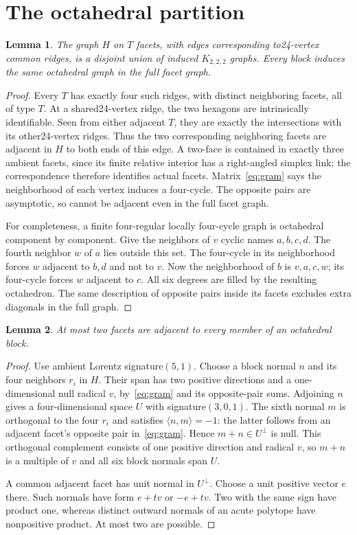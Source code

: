 \documentclass[11pt]{article}
\newtheorem{lemma}{Lemma}
\begin{document}
\section{The octahedral partition}
\begin{lemma}\label{lem:blocks}
The graph $H$ on $T$ facets, with edges corresponding to24-vertex
common ridges, is a disjoint union of induced $K_{2,2,2}$ graphs.
Every block induces the same octahedral graph in the full facet graph.
\end{lemma}
\begin{proof}
Every $T$ has exactly four such ridges, with distinct neighboring
facets, all of type $T$. At a shared24-vertex ridge, the two hexagons
are intrinsically identifiable. Seen from either adjacent $T$, they
are exactly the intersections with its other24-vertex ridges. Thus
the two corresponding neighboring facets are adjacent in $H$ to both
ends of this edge. A two-face is contained in exactly three ambient
facets, since its finite relative interior has a right-angled simplex
link; the correspondence therefore identifies actual facets.
Matrix~\eqref{eq:gram} says the neighborhood of each vertex induces
a four-cycle. The opposite pairs are asymptotic, so cannot be adjacent
even in the full facet graph.

For completeness, a finite four-regular locally four-cycle graph is
octahedral component by component. Give the neighbors of $v$ cyclic
names $a,b,c,d$. The fourth neighbor $w$ of $a$ lies outside this set.
The four-cycle in its neighborhood forces $w$ adjacent to $b,d$ and
not to $v$. Now the neighborhood of $b$ is $v,a,c,w$; its four-cycle
forces $w$ adjacent to $c$. All six degrees are filled by the resulting
octahedron. The same description of opposite pairs inside its facets
excludes extra diagonals in the full graph.
\end{proof}

\begin{lemma}\label{lem:common}
At most two facets are adjacent to every member of an octahedral block.
\end{lemma}
\begin{proof}
Use ambient Lorentz signature$(5,1)$. Choose a block normal $n$ and
its four neighbors $r_i$ in $H$. Their span has two positive directions
and a one-dimensional null radical $v$, by~\eqref{eq:gram} and its
opposite-pair sums. Adjoining $n$ gives a four-dimensional space $U$
with signature$(3,0,1)$. The sixth normal $m$ is orthogonal to the
four $r_i$ and satisfies $\langle n,m\rangle=-1$: the latter follows
from an adjacent facet's opposite pair in~\eqref{eq:gram}.
Hence $m+n\in U^\perp$ is null. This orthogonal complement consists
of one positive direction and radical $v$, so $m+n$ is a multiple of
$v$ and all six block normals span $U$.

A common adjacent facet has unit normal in $U^\perp$. Choose a unit
positive vector $e$ there. Such normals have form $e+tv$ or $-e+tv$.
Two with the same sign have product one, whereas distinct outward
normals of an acute polytope have nonpositive product. At most two
are possible.
\end{proof}
\end{document}
